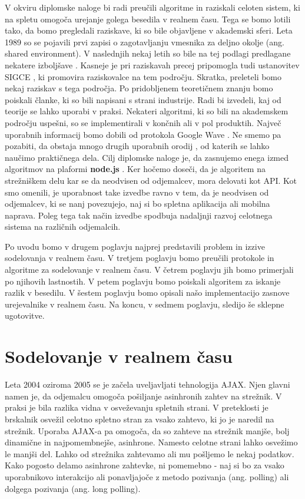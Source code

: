 \documentclass[a4paper, 12pt, twoside]{book}
\begin{document}
V okviru diplomske naloge bi radi preučili algoritme in raziskali celoten sistem, ki na spletu omogoča urejanje golega besedila v realnem času. Tega se bomo lotili tako, da bomo pregledali raziskave, ki so bile objavljene v akademski sferi. Leta 1989 so se pojavili prvi zapisi \cite{ccigs} o zagotavljanju vmesnika za deljno okolje  (ang. shared environment). V naslednjih nekaj letih so bile na tej podlagi predlagane nekatere izboljšave \cite{hllbw}. Kasneje je pri raziskavah precej pripomogla tudi ustanovitev SIGCE \cite{sigce}, ki promovira raziskovalce na tem področju. Skratka, preleteli bomo nekaj raziskav s tega področja. Po pridobljenem teoretičnem znanju bomo poiskali članke, ki so bili napisani s strani industrije. Radi bi izvedeli, kaj od teorije se lahko uporabi v praksi. Nekateri algoritmi, ki so bili na akademskem področju uspešni, so se implementirali v končnih ali v pol produktih. Največ uporabnih informacij bomo dobili od protokola Google Wave \cite{wave-ot}. Ne smemo pa pozabiti, da obstaja mnogo drugih uporabnih orodij \cite{share}, od katerih se lahko naučimo praktičnega dela. Cilj diplomske naloge je, da zasnujemo enega izmed algoritmov na plaformi \textbf{node.js} \cite{node}.  Ker hočemo doseči, da je algoritem na strežniškem delu kar se da neodvisen od odjemalcev, mora delovati kot API. Kot smo omenili, je uporabnost take izvedbe ravno v tem, da je neodvisen od odjemalcev, ki se nanj povezujejo, naj si bo spletna aplikacija ali mobilna naprava. Poleg tega tak način izvedbe spodbuja nadaljnji razvoj celotnega sistema na različnih odjemalcih.

Po uvodu bomo v drugem poglavju najprej predstavili problem in izzive sodelovanja v realnem času. V tretjem poglavju bomo preučili protokole in algoritme za sodelovanje v realnem času. V četrem poglavju jih bomo primerjali po njihovih lastnostih. V petem poglavju bomo poiskali algoritem za iskanje razlik v besedilu. V šestem poglavju bomo opisali našo implementacijo zasnove urejevalnike v realnem času. Na koncu, v sedmem poglavju, sledijo še sklepne ugotovitve.

\chapter{Sodelovanje v realnem času}

Leta 2004 oziroma 2005 se je začela uveljavljati tehnologija AJAX. Njen glavni namen je, da odjemalcu omogoča pošiljanje asinhronih zahtev na strežnik. V praksi je bila razlika vidna v osveževanju spletnih strani. V preteklosti je brskalnik osvežil celotno spletno stran za vsako zahtevo, ki jo je naredil na strežnik. Uporaba AJAX-a pa omogoča, da so zahteve na strežnik manjše, bolj dinamične in najpomembnejše, asinhrone. Namesto celotne strani lahko osvežimo le manjši del. Lahko od strežnika zahtevamo ali mu pošljemo le nekaj podatkov. Kako pogosto delamo asinhrone zahtevke, ni pomemebno - naj si bo za vsako uporabnikovo interakcijo ali ponavljajoče z metodo pozivanja (ang. polling) \cite{diffsync} ali dolgega pozivanja (ang. long polling).
\end{document}
